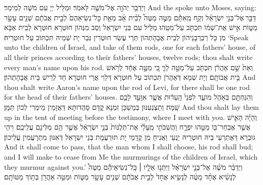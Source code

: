 {וַיְדַבֵּ֥ר יְהֹוָ֖ה אֶל־מֹשֶׁ֥ה לֵּאמֹֽר׃}
{וּמַלֵּיל יְיָ עִם מֹשֶׁה לְמֵימַר׃}
{And the \lord\space spoke unto Moses, saying:}{}
{דַּבֵּ֣ר \legarmeh  אֶל־בְּנֵ֣י יִשְׂרָאֵ֗ל וְקַ֣ח מֵֽאִתָּ֡ם מַטֶּ֣ה מַטֶּה֩ לְבֵ֨ית אָ֜ב מֵאֵ֤ת כׇּל־נְשִֽׂיאֵהֶם֙ לְבֵ֣ית אֲבֹתָ֔ם שְׁנֵ֥ים עָשָׂ֖ר מַטּ֑וֹת אִ֣ישׁ אֶת־שְׁמ֔וֹ תִּכְתֹּ֖ב עַל־מַטֵּֽהוּ׃}
{מַלֵּיל עִם בְּנֵי יִשְׂרָאֵל וְסַב מִנְּהוֹן חוּטְרָא חוּטְרָא לְבֵית אַבָּא מִן כָּל רַבְרְבָנֵיהוֹן לְבֵית אֲבָהָתְהוֹן תְּרֵי עֲשַׂר חוּטְרִין גְּבַר יָת שְׁמֵיהּ תִּכְתּוֹב עַל חוּטְרֵיהּ׃}
{‘Speak unto the children of Israel, and take of them rods, one for each fathers’ house, of all their princes according to their fathers’ houses, twelve rods; thou shalt write every man’s name upon his rod.}{}
{וְאֵת֙ שֵׁ֣ם אַהֲרֹ֔ן תִּכְתֹּ֖ב עַל־מַטֵּ֣ה לֵוִ֑י כִּ֚י מַטֶּ֣ה אֶחָ֔ד לְרֹ֖אשׁ בֵּ֥ית אֲבוֹתָֽם׃
}
{וְיָת שְׁמָא דְּאַהֲרֹן תִּכְתּוֹב עַל חוּטְרָא דְּלֵוִי אֲרֵי חוּטְרָא חַד לְרֵישׁ בֵּית אֲבָהָתְהוֹן׃}
{And thou shalt write Aaron’s name upon the rod of Levi, for there shall be one rod for the head of their fathers’ houses.}{}
{וְהִנַּחְתָּ֖ם בְּאֹ֣הֶל מוֹעֵ֑ד לִפְנֵי֙ הָֽעֵד֔וּת אֲשֶׁ֛ר אִוָּעֵ֥ד לָכֶ֖ם שָֽׁמָּה׃}
{וְתַצְנְעִנּוּן בְּמַשְׁכַּן זִמְנָא קֳדָם סָהֲדוּתָא דַּאֲזָמֵין מֵימְרִי לְכוֹן תַּמָּן׃}
{And thou shalt lay them up in the tent of meeting before the testimony, where I meet with you.}{}
{וְהָיָ֗ה הָאִ֛ישׁ אֲשֶׁ֥ר אֶבְחַר־בּ֖וֹ מַטֵּ֣הוּ יִפְרָ֑ח וַהֲשִׁכֹּתִ֣י מֵֽעָלַ֗י אֶת־תְּלֻנּוֹת֙ בְּנֵ֣י יִשְׂרָאֵ֔ל אֲשֶׁ֛ר הֵ֥ם מַלִּינִ֖ם עֲלֵיכֶֽם׃
}
{וִיהֵי גּוּבְרָא דְּאֶתְרְעֵי בֵיהּ חוּטְרֵיהּ יַנְעֵי וַאֲנִיחַ מִן קֳדָמַי יָת תּוּרְעֲמָת בְּנֵי יִשְׂרָאֵל דְּאִנּוּן מִתְרָעֲמִין עֲלֵיכוֹן׃}
{And it shall come to pass, that the man whom I shall choose, his rod shall bud; and I will make to cease from Me the murmurings of the children of Israel, which they murmur against you.’}{}
{וַיְדַבֵּ֨ר מֹשֶׁ֜ה אֶל־בְּנֵ֣י יִשְׂרָאֵ֗ל וַיִּתְּנ֣וּ אֵלָ֣יו \small ׀\normalsize  כָּֽל־נְשִׂיאֵיהֶ֡ם מַטֶּה֩ לְנָשִׂ֨יא אֶחָ֜ד מַטֶּ֨ה לְנָשִׂ֤יא אֶחָד֙ לְבֵ֣ית אֲבֹתָ֔ם שְׁנֵ֥ים עָשָׂ֖ר מַטּ֑וֹת וּמַטֵּ֥ה אַהֲרֹ֖ן בְּת֥וֹךְ מַטּוֹתָֽם׃
}
